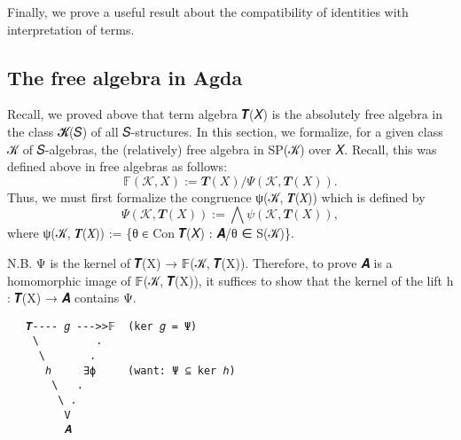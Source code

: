 \documentclass[a4paper,USenglish,cleveref,autoref,thm-restate]{lipics-v2019}
\begin{document}
Finally, we prove a useful result about the compatibility of identities with interpretation of terms.
\begin{code}\end{code}






















\subsection{The free algebra in Agda}\label{the-free-algebra-in-agda}
Recall, we proved above that term algebra 𝑻(𝑋) is the absolutely free algebra in the class 𝓚(𝑆) of all 𝑆-structures. In this section, we formalize, for a given class 𝒦 of 𝑆-algebras, the (relatively) free algebra in SP(𝒦) over 𝑋. Recall, this was defined above in free algebras as follows:
\[𝔽(𝒦, 𝑋) := 𝑻(𝑋)/Ψ(𝒦, 𝑻(𝑋)).\]
Thus, we must first formalize the congruence ψ(𝒦, 𝑻(𝑋)) which is defined by
\[Ψ(𝒦, 𝑻(𝑋)) := ⋀ ψ(𝒦, 𝑻(𝑋)),\]
where ψ(𝒦, 𝑻(𝑋)) := \{θ ∈ Con 𝑻(𝑋) : 𝑨/θ ∈ S(𝒦)\}.
\begin{code}\end{code}

N.B. Ψ is the kernel of 𝑻(X) → 𝔽(𝒦, 𝑻(X)). Therefore, to prove 𝑨 is a homomorphic image of 𝔽(𝒦, 𝑻(X)), it suffices to show that the kernel of the lift h : 𝑻(X) → 𝑨 contains Ψ.

\begin{verbatim}
   𝑻---- 𝑔 --->>𝔽  (ker 𝑔 = Ψ)
    \         .
     \       .
      ℎ     ∃ϕ     (want: Ψ ⊆ ker ℎ)
       \   .
        \ .
         V
         𝑨
\end{verbatim}
\end{document}
